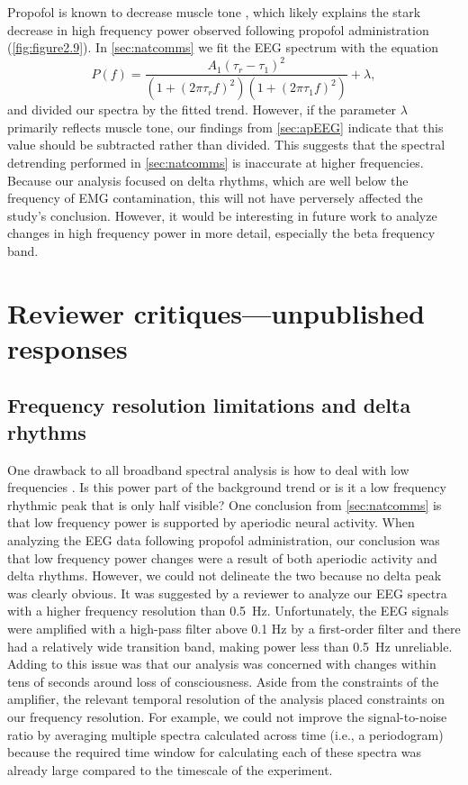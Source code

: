 Propofol is known to decrease muscle tone \cite{Brown2011}, which likely explains the stark decrease in high frequency power observed following propofol administration (\autoref{fig:figure2.9}). In \autoref{sec:natcomms} we fit the EEG spectrum with the equation
\begin{equation*}
P(f) = \frac{A_1\left(\tau_r-\tau_1\right)^2}{\left(1+\left(2\pi\tau_rf\right)^2\right)\left(1+\left(2\pi\tau_1f\right)^2\right)}+\lambda\mathrm{,}
\end{equation*}
and divided our spectra by the fitted trend. However, if the parameter $\lambda$ primarily reflects muscle tone, our findings from \autoref{sec:apEEG} indicate that this value should be subtracted rather than divided. This suggests that the spectral detrending performed in \autoref{sec:natcomms} is inaccurate at higher frequencies. Because our analysis focused on delta rhythms, which are well below the frequency of EMG contamination, this will not have perversely affected the study's conclusion. However, it would be interesting in future work to analyze changes in high frequency power in more detail, especially the beta frequency band. 

\section{Reviewer critiques---unpublished responses}

\subsection{Frequency resolution limitations and delta rhythms}
One drawback to all broadband spectral analysis is how to deal with low frequencies \cite{Demanuele2007,Gerster2022}. Is this power part of the background trend or is it a low frequency rhythmic peak that is only half visible? One conclusion from \autoref{sec:natcomms} is that low frequency power is supported by aperiodic neural activity. When analyzing the EEG data following propofol administration, our conclusion was that low frequency power changes were a result of both aperiodic activity and delta rhythms. However, we could not delineate the two because no delta peak was clearly obvious. It was suggested by a reviewer to analyze our EEG spectra with a higher frequency resolution than \qty{0.5}{\hertz}. Unfortunately, the EEG signals were amplified with a high-pass filter above 0.1 Hz by a first-order filter and there had a relatively wide transition band, making power less than \qty{0.5}{\hertz} unreliable. Adding to this issue was that our analysis was concerned with changes within tens of seconds around loss of consciousness. Aside from the constraints of the amplifier, the relevant temporal resolution of the analysis placed constraints on our frequency resolution. For example, we could not improve the signal-to-noise ratio by averaging multiple spectra calculated across time (i.e., a periodogram) because the required time window for calculating each of these spectra was already large compared to the timescale of the experiment.

